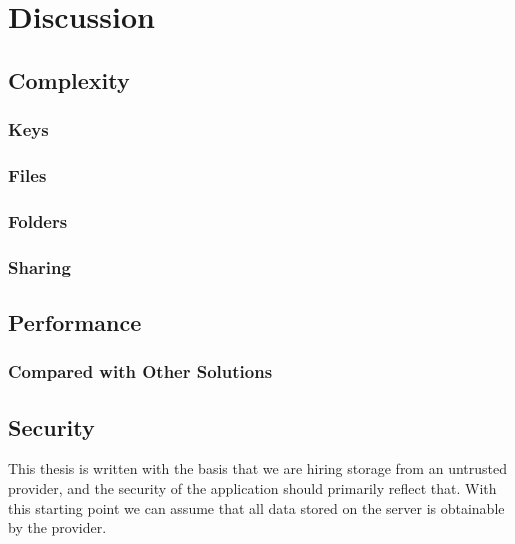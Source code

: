 \documentclass[pdftex,english,10pt,b5paper,twoside]{book}
\begin{document}
\chapter{Discussion}
\section{Complexity}


\subsection{Keys}
\subsection{Files}

\subsection{Folders}

\subsection{Sharing}

\section{Performance}

\subsection{Compared with Other Solutions}

\section{Security}
This thesis is written with the basis that we are hiring storage from an
untrusted provider, and the security of the application should primarily
reflect that. With this starting point we can assume that all data stored on
the server is obtainable by the provider.
\end{document}
